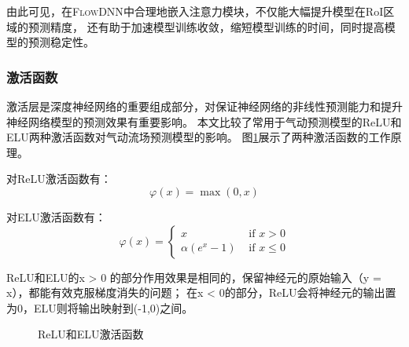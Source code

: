 由此可见，在\textsc{FlowDNN}中合理地嵌入注意力模块，不仅能大幅提升模型在RoI区域的预测精度，
还有助于加速模型训练收敛，缩短模型训练的时间，同时提高模型的预测稳定性。


\subsubsection{激活函数}\label{ac_effect}
激活层是深度神经网络的重要组成部分，对保证神经网络的非线性预测能力和提升神经网络模型的预测效果有重要影响。
本文比较了常用于气动预测模型的ReLU和ELU两种激活函数对气动流场预测模型的影响。
图\ref{fig:activation_intro}展示了两种激活函数的工作原理。

对ReLU激活函数有：
\begin{equation}
\varphi(x)=\max (0, x)
\end{equation}

\noindent 对ELU激活函数有：
\begin{equation}
\varphi(x)=\left\{\begin{array}{ll}
x & \text { if } x>0 \\
\alpha\left(e^{x}-1\right) & \text { if } x \leq 0
\end{array}\right.
\end{equation}

\noindent ReLU和ELU的x > 0 的部分作用效果是相同的，保留神经元的原始输入（y = x），都能有效克服梯度消失的问题\cite{2010Rectified}；
在x < 0的部分，ReLU会将神经元的输出置为0，ELU则将输出映射到(-1,0)之间。


\begin{figure}[htb]
	\centering
	 \qquad
	\caption{ReLU和ELU激活函数}
	\label{fig:activation_intro}
\end{figure}


